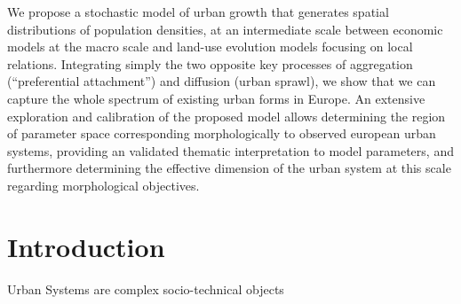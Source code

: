 \documentclass[10pt,letterpaper]{article}
\begin{document}
We propose a stochastic model of urban growth that generates spatial distributions of population densities, at an intermediate scale between economic models at the macro scale and land-use evolution models focusing on local relations. Integrating simply the two opposite key processes of aggregation (``preferential attachment'') and diffusion (urban sprawl), we show that we can capture the whole spectrum of existing urban forms in Europe. An extensive exploration and calibration of the proposed model allows determining the region of parameter space corresponding morphologically to observed european urban systems, providing an validated thematic interpretation to model parameters, and furthermore determining the effective dimension of the urban system at this scale regarding morphological objectives.







\linenumbers





\section*{Introduction}

Urban Systems are complex socio-technical objects





\end{document}
